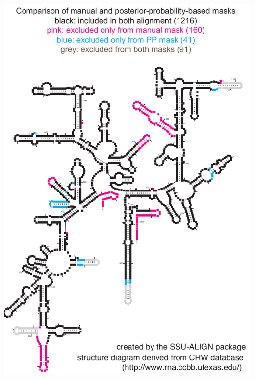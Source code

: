 \documentclass[landscape]{slides}
\begin{document}
\begin{slide}\begin{center}\includegraphics[height=8in]{figs/archaea-mask-ph-v-pp-diff}\end{center}\vfill\end{slide}
\end{document}
